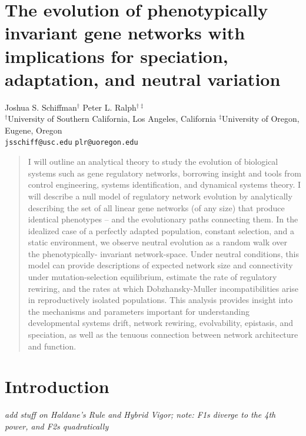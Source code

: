 \documentclass[9 pt]{article}
\newcommand{\jss}[1]{{\color{olive}\it #1}}
\newcommand{\1}{\mathbbm{1}}
\begin{document}
\section*{The evolution of phenotypically invariant gene networks with implications for speciation, adaptation, and neutral variation}
{\centering
Joshua S. Schiffman$^{\dagger}$ \qquad Peter L. Ralph$^{\dagger \ddagger}$ \\
$^{\dagger}$University of Southern California, Los Angeles, California \qquad $^{\ddagger}$University of Oregon, Eugene, Oregon \\
\texttt{jsschiff@usc.edu} \qquad \texttt{plr@uoregon.edu}
\\
}



\begin{abstract}
I will outline an analytical theory to study the evolution of biological systems such as gene regulatory networks, borrowing insight and tools from control engineering, systems identification, and dynamical systems theory. I will describe a null model of regulatory network evolution by analytically describing the set of all linear gene networks (of any size) that produce identical phenotypes -- and the evolutionary paths connecting them. In the idealized case of a perfectly adapted population, constant selection, and a static environment, we observe neutral evolution as a random walk over the phenotypically- invariant network-space. Under neutral conditions, this model can provide descriptions of expected network size and connectivity under mutation-selection equilibrium, estimate the rate of regulatory rewiring, and the rates at which Dobzhansky-Muller incompatibilities arise in reproductively isolated populations. This analysis provides insight into the mechanisms and parameters important for understanding developmental systems drift, network rewiring, evolvability, epistasis, and speciation, as well as the tenuous connection between network architecture and function. 
\end{abstract}
\section*{Introduction}

  \jss{add stuff on Haldane's Rule and Hybrid Vigor; note: F1s diverge to the 4th power, and F2s quadratically}
\end{document}
